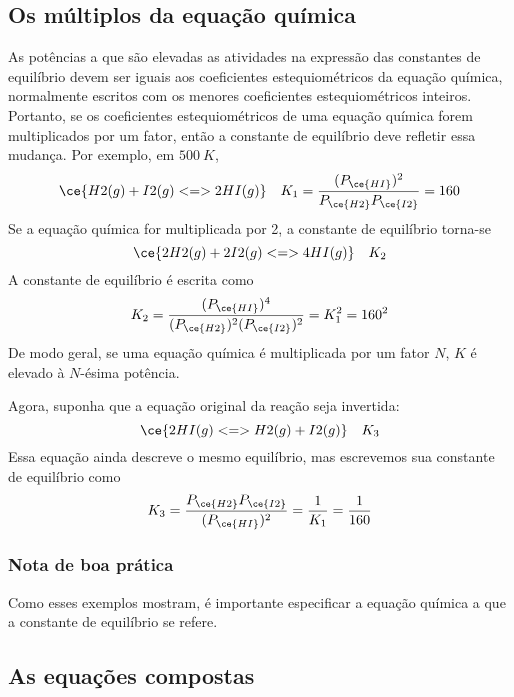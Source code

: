 \subsection{Os múltiplos da equação química}

As potências a que são elevadas as atividades na expressão das constantes de equilíbrio devem ser iguais aos coeficientes estequiométricos da equação
química, normalmente escritos com os menores coeficientes estequiométricos inteiros. Portanto, se os coeficientes estequiométricos de uma equação
química forem multiplicados por um fator, então a constante de equilíbrio deve refletir essa mudança. Por exemplo, em \(\qty{500}{\unit{K}}\), \[
    \ce{ H2(g) + I2(g) <=> 2 HI(g) } 
        \quad K_1 = \dfrac{ (P_{\ce{HI}})^2 }{ P_{\ce{H2}} P_{\ce{I2}} } = 160
\] Se a equação química for multiplicada por 2, a constante de equilíbrio torna-se \[
    \ce{ 2 H2(g) + 2 I2(g) <=> 4 HI(g) } \quad K_2
\] A constante de equilíbrio é escrita como \[
    K_2 = \dfrac{ (P_{\ce{HI}})^4 }{ (P_{\ce{H2}})^2 (P_{\ce{I2}})^2 } 
        = K_1^2 
        = 160^2
\] De modo geral, se uma equação química é multiplicada por um fator \(N\), \(K\) é elevado à \(N\)-ésima potência.

Agora, suponha que a equação original da reação seja invertida: \[
    \ce{ 2 HI(g) <=> H2(g) + I2(g) } \quad K_3
\] Essa equação ainda descreve o mesmo equilíbrio, mas escrevemos sua constante de equilíbrio como \[
    K_3 = \dfrac{ P_{\ce{H2}} P_{\ce{I2}} }{ (P_{\ce{HI}})^2 } 
        = \dfrac{1}{K_1} 
        = \dfrac{1}{160}
\]

\begin{info}

\subsubsection{Nota de boa prática}

Como esses exemplos mostram, é importante especificar a equação química a que a constante de equilíbrio se refere.

\end{info}

\subsection{As equações compostas}

